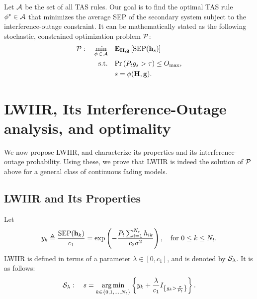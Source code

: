 \documentclass[12pt,draftcls,peerreview,onecolumn]{IEEEtran}
\newcommand{\brac}[1]{\left({#1}\right)}
\newcommand{\cbrac}[1]{\left\{{#1}\right\}}
\newcommand{\indic}[1]{I_{\cbrac{#1}}}
\newcommand{\define}{\triangleq}
\newcommand{\tendsto}{\to}
\newcommand{\mtx}[1]{{\bf #1}} %
\newcommand{\explow}[2]{{\bf{E}}_{#1}\left[{#2}\right]}
\newcommand{\prob}[1]{\text{Pr}\brac{#1}}
\DeclareMathOperator*{\argmin}{arg\,min}
\newcommand{\SEP}{\text{SEP}}
\newcommand{\nx}{{0}}
\newcommand{\lam}{\lambda}
\newcommand{\Nt}{{N_t}}
\newcommand{\Nr}{{N_r}}
\newcommand{\Pt}{{P_t}}
\newcommand{\such}{h}
\newcommand{\puch}{g}
\newcommand{\hk}[1]{{\such_{#1}}}
\newcommand{\gk}[1]{{\puch_{#1}}}
\newcommand{\g}{\mathbf{\puch}}
\newcommand{\noisevar}{\sigma^2}
\newcommand{\outmax}{O_{\text{max}}}
\newcommand{\itau}{\tau}
\newcommand{\cone}{c_{1}}
\newcommand{\ctwo}{c_{2}}
\newcommand{\taubypt}{\frac{\itau}{\Pt}}
\newcommand{\gkgrtaubypt}[1]{{\gk{#1}}>\taubypt}
\newcommand{\gindic}[1]{\indic{\gkgrtaubypt{#1}}}
\newcommand{\lambym}{\frac{\lam}{\cone}}
\newcommand{\yk}[1]{y_{#1}}
\newcommand{\ykplusgk}[1]{ \yk{#1} + \lambym\gindic{#1}}
\newcommand{\allopts}{\left\{\nx,1,\ldots,\Nt\right\}}
\newcommand{\asrule}{\phi}
\newcommand{\asspan}{{\cal A}}
\newcommand{\Hmx}{\mtx{H}}
\newcommand{\optproblem}{{\cal P}}
\newcommand{\callamrule}{{\cal S_{{\lam}}}}
\begin{document}
Let $\asspan$ be the set of all TAS rules. Our goal is to find the optimal TAS rule $\phi^{*}\in\asspan$ that minimizes the average SEP of the secondary system subject to the interference-outage constraint. It can be mathematically stated as the  following stochastic, constrained optimization problem $\optproblem$:
\begin{align}
\label{eq:objective}
\optproblem: \quad \min_{\asrule\,\in\,\asspan} \quad
&\explow{\Hmx,\g}{\SEP(\hs)} \\
\label{eq:cons}
\text{s.t.} \quad &\prob{\Pt\gk{s}>\itau} \leq \outmax, \\
 &s = \phi(\Hmx,\g). 
\end{align}



\section{LWIIR, Its Interference-Outage analysis, and optimality}
\label{sec:analysis}
%
We now propose LWIIR, and characterize its properties and its interference-outage probability. Using these, we prove that LWIIR is indeed the solution of  $\optproblem$ above for a general class of continuous fading models. %


\subsection{LWIIR and Its Properties}
\label{sec:lambda_rule}
Let 
\begin{equation}
\yk{k} \define \frac{\SEP(\bhk{k})}{\cone} = \exp\left({- \frac{\Pt\sum_{i=1}^{\Nr}\hk{ik}}{\ctwo\noisevar} }\right), \quad \text{for}\,\,  0\leq k \leq\Nt.
\label{eq:yi_def}
\end{equation}
LWIIR is defined in terms of a parameter $\lam \in \left[0, \cone\right]$, and is denoted by $\callamrule$. It is as follows:
\begin{equation}
\callamrule: \quad s=\argmin\limits_{k\in\allopts} \left\{ \ykplusgk{k} \right\}.
\label{eq:lam_weight_rule}
\end{equation}
\end{document}
